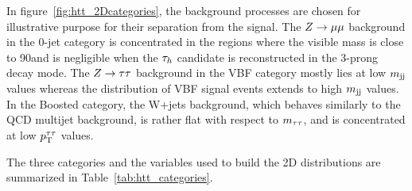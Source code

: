 In figure~\ref{fig:htt_2Dcategories}, the background processes are chosen for illustrative 
purpose for their separation from 
the signal. The $Z\to\mu\mu$ background in the 0-jet category is concentrated in 
the regions where the visible mass is close to 90\GeV and is negligible when the $\tau_{h}$ 
candidate is reconstructed in the 3-prong decay mode. The $Z\to\tau\tau$ background in 
the VBF category mostly lies at low $m_\mathrm{jj}$ values whereas the distribution of VBF signal 
events extends to high $m_\mathrm{jj}$ values. In the Boosted category, the W+jets background, 
which behaves similarly to the QCD multijet background, is rather flat with respect to $m_{\tau\tau}$, and 
is concentrated at low $p_\mathrm{T}^{\tau\tau}$ values.

The three categories and the variables used to build the 2D distributions are summarized in
Table~\ref{tab:htt_categories}. 

